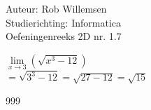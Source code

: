 \documentclass[a4paper]{article}
\begin{document}
\noindent \large Auteur: Rob Willemsen \\
\noindent \large Studierichting: Informatica\\
\noindent \large Oefeningenreeks 2D nr. 1.7\\

\medskip

\normalsize

$\lim\limits_{x \rightarrow 3} (\sqrt{x^3 - 12})$ \\ 

$= \sqrt{3^3 - 12} = \sqrt{27 - 12} = \sqrt{15}$ \\

\begin{thebibliography}{999}
\end{thebibliography}
\end{document}
